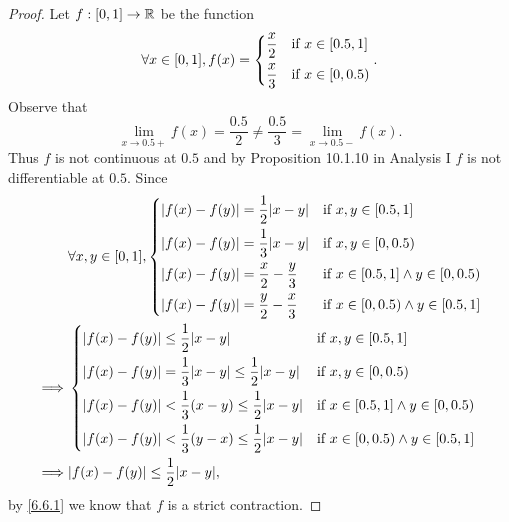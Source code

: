 \begin{proof}
  Let \(f : [0, 1] \to \mathbb{R}\) be the function
  \[
    \forall x \in [0, 1], f(x) = \begin{dcases}
      \dfrac{x}{2} & \text{if } x \in [0.5, 1] \\
      \dfrac{x}{3} & \text{if } x \in [0, 0.5)
    \end{dcases}.
  \]
  Observe that
  \[
    \lim_{x \to 0.5+} f(x) = \dfrac{0.5}{2} \neq \dfrac{0.5}{3} = \lim_{x \to 0.5-} f(x).
  \]
  Thus \(f\) is not continuous at \(0.5\) and by Proposition 10.1.10 in Analysis I \(f\) is not differentiable at \(0.5\).
  Since
  \begin{align*}
             & \forall x, y \in [0, 1], \begin{dcases}
                                          \abs{f(x) - f(y)} = \dfrac{1}{2} \abs{x - y}    & \text{if } x, y \in [0.5, 1]                   \\
                                          \abs{f(x) - f(y)} = \dfrac{1}{3} \abs{x - y}    & \text{if } x, y \in [0, 0.5)                   \\
                                          \abs{f(x) - f(y)} = \dfrac{x}{2} - \dfrac{y}{3} & \text{if } x \in [0.5, 1] \land y \in [0, 0.5) \\
                                          \abs{f(x) - f(y)} = \dfrac{y}{2} - \dfrac{x}{3} & \text{if } x \in [0, 0.5) \land y \in [0.5, 1]
                                        \end{dcases}   \\
    \implies & \begin{dcases}
                 \abs{f(x) - f(y)} \leq \dfrac{1}{2} \abs{x - y}                            & \text{if } x, y \in [0.5, 1]                   \\
                 \abs{f(x) - f(y)} = \dfrac{1}{3} \abs{x - y} \leq \dfrac{1}{2} \abs{x - y} & \text{if } x, y \in [0, 0.5)                   \\
                 \abs{f(x) - f(y)} < \dfrac{1}{3} (x - y) \leq \dfrac{1}{2} \abs{x - y}     & \text{if } x \in [0.5, 1] \land y \in [0, 0.5) \\
                 \abs{f(x) - f(y)} < \dfrac{1}{3} (y - x) \leq \dfrac{1}{2} \abs{x - y}     & \text{if } x \in [0, 0.5) \land y \in [0.5, 1]
               \end{dcases} \\
    \implies & \abs{f(x) - f(y)} \leq \dfrac{1}{2} \abs{x - y},
  \end{align*}
  by \cref{6.6.1} we know that \(f\) is a strict contraction.
\end{proof}

